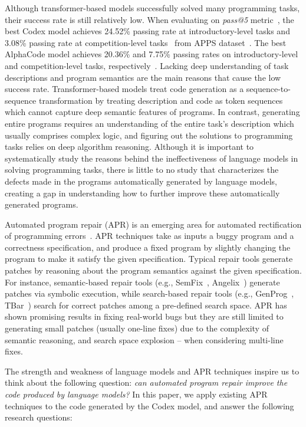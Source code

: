 Although transformer-based models successfully solved many programming tasks, their success rate is still relatively low. When evaluating on \emph{pass@5} metric~\cite{codex}, the best Codex model achieves 24.52\% passing rate at introductory-level tasks and 3.08\% passing rate at competition-level tasks~\cite{codex} from APPS dataset~\cite{apps}. The best AlphaCode model achieves 20.36\% and 7.75\% passing rates on introductory-level and competition-level tasks, respectively~\cite{alphacode}. Lacking deep understanding of task descriptions and program semantics are the main reasons that cause the low success rate. Transformer-based models treat code generation as a sequence-to-sequence transformation by treating description and code as token sequences which cannot capture deep semantic features of programs. In contrast, generating entire programs requires an understanding of the entire task's description which usually comprises complex logic, and figuring out the solutions to programming tasks relies on deep algorithm reasoning. Although it is important to systematically study the reasons behind the ineffectiveness of language models in solving programming tasks, there is little to no study that characterizes the defects made in the programs automatically generated by language models, creating a gap in understanding how to further improve these automatically generated programs. 

Automated program repair (APR) is an emerging area for automated rectification of programming errors~\cite{apr}. APR techniques take as inputs a buggy program and a correctness specification, and produce a fixed program by slightly changing the program to make it satisfy the given specification. Typical repair tools generate patches by reasoning about the program semantics against the given specification. For instance, semantic-based repair tools (e.g., SemFix~\cite{semfix}, Angelix~\cite{angelix}) generate patches via symbolic execution, while search-based repair tools (e.g., GenProg~\cite{genprog}, TBar~\cite{tbar}) search for correct patches among a pre-defined search space. APR has shown promising results in fixing real-world bugs but they are still limited to generating small patches (usually one-line fixes) due to the complexity of semantic reasoning, and search space explosion -- when considering multi-line fixes.

The strength and weakness of language models and APR techniques inspire us to think about the following question: \textit{can automated program repair improve the code produced by language models?} In this paper, we apply existing APR techniques to the code generated by the Codex model, and answer the following research questions:

